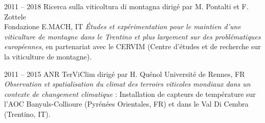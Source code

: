 \documentclass[]{cv-etienne}
\begin{document}
\begin{entrylist}
\entry
{2011 -- 2018}
{Ricerca sulla viticoltura di montagna  {\normalfont  dirigé par M. Pontalti et F. Zottele \\}}
{ Fondazione E.MACH, IT}
{\emph{Études et expérimentation pour le maintien d'une viticulture de montagne dans le Trentino et plus largement sur des problématiques européennes}, en partenariat avec le CERVIM  (Centre d'études et de recherche sur la viticulture de montagne).}
\end{entrylist}
\begin{entrylist}
\entry
{2011 -- 2015}
{ANR TerViClim {\normalfont dirigé par H. Quénol}}
{ Université de Rennes, FR}
{\emph{Observation et spatialisation du climat des terroirs viticoles mondiaux dans un contexte de changement climatique} :
Installation de capteurs de température sur l'AOC Banyuls-Collioure (Pyrénées Orientales, FR) et dans le Val Di Cembra (Trentino, IT).}
\end{entrylist}
\end{document}
